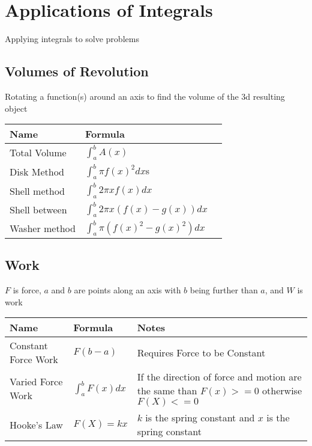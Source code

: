 \documentclass[17pt]{extarticle}
\begin{document}
\section{Applications of Integrals}
Applying integrals to solve problems
\subsection{Volumes of Revolution}
Rotating a function(s) around an axis to find the volume of the 3d resulting object
\renewcommand{\arraystretch}{2}
\begin{table}[H]
\centering
\begin{tabular}{|l|l|l|}
\hline
\rowcolor{githublightgray}
Name & Formula\\
\hline
Total Volume & $\int_{a}^{b}A(x)$\\
\hline
Disk Method &$\int_{a}^{b}\pi f(x)^2dx$s\\
\hline
Shell method &$\int_{a}^{b}2\pi xf(x)dx$\\
\hline
Shell between &$\int_{a}^{b}2\pi x(f(x)-g(x))dx$\\
\hline
Washer method &$\int_{a}^{b}\pi(f(x)^2-g(x)^2)dx$\\
\hline
\end{tabular}
\end{table}

\clearpage
\subsection{Work}
$F$ is force, $a$ and $b$ are points along an axis with $b$ being further than $a$, and $W$ is work\\
\renewcommand{\arraystretch}{2}
\begin{table}[H]
\centering
\begin{tabular}{|l|l|l|}
\hline
\rowcolor{githublightgray}
Name & Formula & Notes\\
\hline
Constant Force Work&$F(b-a)$&Requires Force to be Constant\\
\hline
Varied Force Work&$\int_{a}^{b}F(x)dx$&\makecell{If the direction of force and motion are the \\same than $F(x)>=0$ otherwise $F(X)<=0$}\\
\hline
Hooke's Law&$F(X)=kx$&\makecell{$k$ is the spring constant and $x$ is the spring \\constant}\\
\hline
\end{tabular} 
\end{table}
\end{document}
